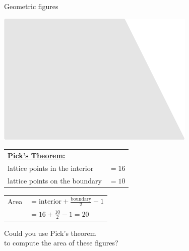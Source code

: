 \documentclass[14pt]{beamer}
\begin{document}

    \begin{frame}{Geometric figures}
        \begin{center}
            \begin{minipage}{0.5\textwidth}%
                \centering \includegraphics[scale=0.70]{figures/figure022c.pdf}
            \end{minipage}\hfill\begin{minipage}{0.49\textwidth} \footnotesize
                \begin{tabular}{ll}
                    \multicolumn{2}{l}{\small \textbf{\href{https://en.wikipedia.org/wiki/Pick\%27s_theorem}{Pick's Theorem:}}} \\[4ex]
                    lattice points in the interior & $\!\!\!\!\! = 16$  \\[2ex]
                    lattice points on the boundary & $\!\!\!\!\! = 10$  \\
                \end{tabular}

                \bigskip \medskip

                \begin{tabular}{ll}
                    Area & $\!\!\!\!\!= \text{interior} + \frac{\text{boundary}}{2} - 1$ \\[2ex]
                         & $\!\!\!\!\!= 16 + \frac{10}{2} - 1 = 20$
                \end{tabular}

            \end{minipage}

            \bigskip \bigskip

            Could you use Pick's theorem\\to compute the area of these figures?
        \end{center}

    \end{frame}
\end{document}
